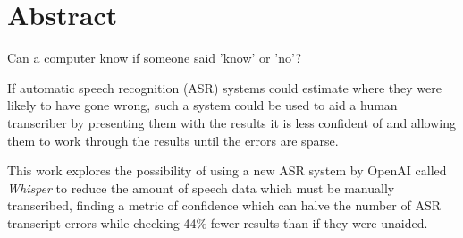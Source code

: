\chapter*{\Large \center Abstract}

Can a computer know if someone said 'know' or 'no'?

If automatic speech recognition (ASR) systems could estimate where they were likely to have gone wrong, such a system could be used to aid a human transcriber by presenting them with the results it is less confident of and allowing them to work through the results until the errors are sparse.

This work explores the possibility of using a new ASR system by OpenAI called \emph{Whisper} to reduce the amount of speech data which must be manually transcribed, finding a metric of confidence which can halve the number of ASR transcript errors while checking 44\% fewer results than if they were unaided.
